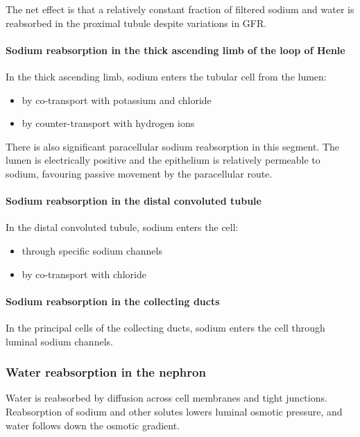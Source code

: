 \documentclass[11pt,a4paper]{article}
\begin{document}
The net effect is that a relatively constant fraction of filtered sodium and water is reabsorbed in the proximal tubule despite variations in GFR.

\paragraph{Sodium reabsorption in the thick ascending limb of the loop of Henle}

In the thick ascending limb, sodium enters the tubular cell from the lumen:
\begin{itemize}
    \item by co-transport with potassium and chloride
    \item by counter-transport with hydrogen ions
\end{itemize}

There is also significant paracellular sodium reabsorption in this segment. The lumen is electrically positive and the epithelium is relatively permeable to sodium, favouring passive movement by the paracellular route.

\paragraph{Sodium reabsorption in the distal convoluted tubule}

In the distal convoluted tubule, sodium enters the cell:
\begin{itemize}
    \item through specific sodium channels
    \item by co-transport with chloride
\end{itemize}

\paragraph{Sodium reabsorption in the collecting ducts}

In the principal cells of the collecting ducts, sodium enters the cell through luminal sodium channels.

\subsubsection{Water reabsorption in the nephron}

Water is reabsorbed by diffusion across cell membranes and tight junctions. Reabsorption of sodium and other solutes lowers luminal osmotic pressure, and water follows down the osmotic gradient.
\end{document}
